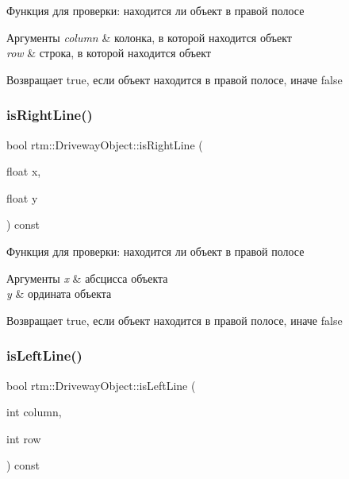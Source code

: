 Функция для проверки\+: находится ли объект в правой полосе 


\begin{DoxyParams}{Аргументы}
{\em column} & колонка, в которой находится объект \\
\hline
{\em row} & строка, в которой находится объект \\
\hline
\end{DoxyParams}
\begin{DoxyReturn}{Возвращает}
true, если объект находится в правой полосе, иначе false 
\end{DoxyReturn}
\mbox{\label{classrtm_1_1_driveway_object_addaa5faebb5469e8074a46f6c3584e56}} 
\subsubsection{\texorpdfstring{is\+Right\+Line()}{isRightLine()}\hspace{0.1cm}{\footnotesize\ttfamily [2/2]}}
{\footnotesize\ttfamily bool rtm\+::\+Driveway\+Object\+::is\+Right\+Line (\begin{DoxyParamCaption}\item[{float}]{x,  }\item[{float}]{y }\end{DoxyParamCaption}) const}



Функция для проверки\+: находится ли объект в правой полосе 


\begin{DoxyParams}{Аргументы}
{\em x} & абсцисса объекта \\
\hline
{\em y} & ордината объекта \\
\hline
\end{DoxyParams}
\begin{DoxyReturn}{Возвращает}
true, если объект находится в правой полосе, иначе false 
\end{DoxyReturn}
\mbox{\label{classrtm_1_1_driveway_object_aea7d711c9cf1ba995bc08d805373cc52}} 
\subsubsection{\texorpdfstring{is\+Left\+Line()}{isLeftLine()}\hspace{0.1cm}{\footnotesize\ttfamily [1/2]}}
{\footnotesize\ttfamily bool rtm\+::\+Driveway\+Object\+::is\+Left\+Line (\begin{DoxyParamCaption}\item[{int}]{column,  }\item[{int}]{row }\end{DoxyParamCaption}) const}



